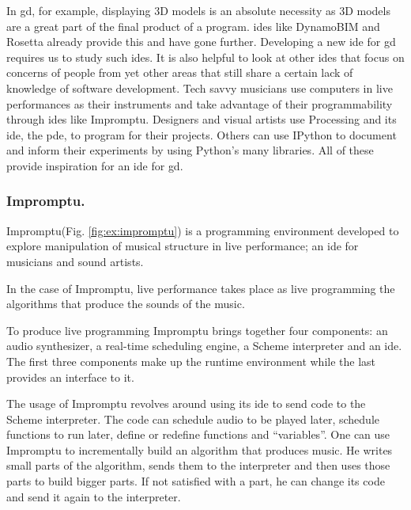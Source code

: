 \documentclass{./llncs2e/llncs}
\begin{document}
	In \ac{gd}, for example, displaying 3D models is an absolute necessity as 3D models are a great part of the final product of a program.
	\ac{ide}s like DynamoBIM\cite{dynamo2015site} and Rosetta already provide this and have gone further.
	Developing a new \ac{ide} for \ac{gd} requires us to study such \ac{ide}s.
	It is also helpful to look at other \ac{ide}s that focus on concerns of people from yet other areas that still share a certain lack of knowledge of software development.
	Tech savvy musicians use computers in live performances as their instruments and take advantage of their programmability through \ac{ide}s like Impromptu.
	Designers and visual artists use Processing and its \ac{ide}, the \ac{pde}, to program for their projects.
	Others can use IPython to document and inform their experiments by using Python's many libraries.
	All of these provide inspiration for an \ac{ide} for \ac{gd}.
	
\subsubsection{Impromptu.}
	Impromptu\cite{sorensen2005impromptu,sorensen2010programming}(Fig. \ref{fig:ex:impromptu}) is a programming environment developed to explore manipulation of musical structure in live performance; an \ac{ide} for musicians and sound artists.
	
	In the case of Impromptu, live performance takes place as live programming the algorithms that produce the sounds of the music.
	
	To produce live programming Impromptu brings together four components: an audio synthesizer, a real-time scheduling engine, a Scheme interpreter and an \ac{ide}. 
	The first three components make up the runtime environment while the last provides an interface to it\cite{sorensen2005impromptu}. 
	
	The usage of Impromptu revolves around using its \ac{ide} to send code to the Scheme interpreter. 
	The code can schedule audio to be played later, schedule functions to run later, define or redefine functions and ``variables''. 
	One can use Impromptu to incrementally build an algorithm that produces music. 
	He writes small parts of the algorithm, sends them to the interpreter and then uses those parts to build bigger parts. 
	If not satisfied with a part, he can change its code and send it again to the interpreter.
	
\end{document}

